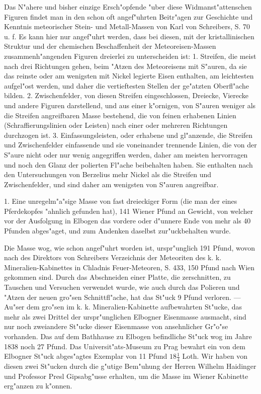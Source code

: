\documentclass[a4paper, 11pt, oneside, polutonikogreek, german]{article}
\begin{document}
\setlength{\leftskip}{10mm}
\setlength{\parindent}{0pt}

{\footnotesize Das N"ahere und bisher einzige Ersch"opfende "uber diese Widmanst"attenschen Figuren findet man in den schon oft angef"uhrten Beitr"agen zur Geschichte und Kenntnis meteorischer Stein- und Metall-Massen von Karl von Schreibers, S. 70 u. f. Es kann hier nur angef"uhrt werden, dass bei diesen, mit der kristallinischen Struktur und der chemischen Beschaffenheit der Meteoreisen-Massen zusammenh"angenden Figuren dreierlei zu unterscheiden ist: 1. Streifen, die meist nach drei Richtungen gehen, beim "Atzen des Meteoreisens mit S"auren, da sie das reinste oder am wenigsten mit Nickel legierte Eisen enthalten, am leichtesten aufgel"ost werden, und daher die vertieftesten Stellen der ge"atzten Oberfl"ache bilden. 2. Zwischenfelder, von diesen Streifen eingeschlossen, Dreiecke, Vierecke und andere Figuren darstellend, und aus einer k"ornigen, von S"auren weniger als die Streifen angreifbaren Masse bestehend, die von feinen erhabenen Linien (Schraffierungslinien oder Leisten) nach einer oder mehreren Richtungen durchzogen ist. 3. Einfassungsleisten, oder erhabene und gl"anzende, die Streifen und Zwischenfelder einfassende und sie voneinander trennende Linien, die von der S"aure nicht oder nur wenig angegriffen werden, daher am meisten hervorragen und noch den Glanz der polierten Fl"ache beibehalten haben. Sie enthalten nach den Untersuchungen von Berzelius mehr Nickel als die Streifen und Zwischenfelder, und sind daher am wenigsten von S"auren angreifbar.}

\setlength{\leftskip}{0pt}
\setlength{\parindent}{20pt}

1. Eine unregelm"a"sige Masse von fast dreieckiger Form (die man der eines Pferdekopfes "ahnlich gefunden hat), 141 Wiener Pfund an Gewicht, von welcher vor der Ausfolgung in Elbogen das vordere oder d"unnere Ende von mehr als 40 Pfunden abges"aget, und zum Andenken daselbst zur"uckbehalten wurde.

\setlength{\leftskip}{10mm}
\setlength{\parindent}{0pt}

{\footnotesize Die Masse wog, wie schon angef"uhrt worden ist, urspr"unglich 191 Pfund, wovon nach des Direktors von Schreibers Verzeichnis der Meteoriten des k. k. Mineralien-Kabinettes in Chladnis Feuer-Meteoren, S. 433, 150 Pfund nach Wien gekommen sind. Durch das Abschneiden einer Platte‚ die zerschnitten, zu Tauschen und Versuchen verwendet wurde, wie auch durch das Polieren und "Atzen der neuen gro"sen Schnittfl"ache, hat das St"uck 9 Pfund verloren. --- Au"ser dem gro"sen im k. k. Mineralien-Kabinette aufbewahrten St"ucke, das mehr als zwei Drittel der urspr"unglichen Elbogner Eisenmasse ausmacht, sind nur noch zweiandere St"ucke dieser Eisenmasse von ansehnlicher Gr"o"se vorhanden. Das auf dem Bathhause zu Elbogen befindliche St"uck wog im Jahre 1838 noch 27 Pfund. Das Universit"ats-Museum zu Prag bewahrt ein von dem Elbogner St"uck abges"agtes Exemplar von 11 Pfund $\mathfrak{18\frac{1}{4}}$ Loth. Wir haben von diesen zwei St"ucken durch die g"utige Bem"uhung der Herren Wilhelm Haidinger und Professor Presl Gipsabg"usse erhalten, um die Masse im Wiener Kabinette erg"anzen zu k"onnen.}
\end{document}

